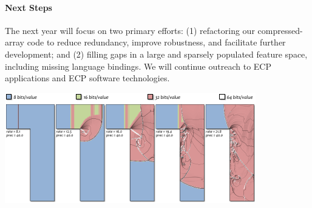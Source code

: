 \noindent
\begin{minipage}[t]{2.625in}
\paragraph{Next Steps}

The next year will focus on two primary efforts: (1) refactoring our compressed-array code to reduce redundancy, improve robustness, and facilitate further development; and (2) filling gaps in a large and sparsely populated feature space, including missing language bindings.  We will continue outreach to ECP applications and ECP software technologies.  
\end{minipage}
\hspace*{0.125in}%
\begin{minipage}[t]{3.75in}
\vspace{0pt}%
\includegraphics[width=\columnwidth]{projects/2.3.4-DataViz/2.3.4.16-ALPINE-ZFP/zfp-adaptive.pdf}%
\vspace{-2ex}%
%
\label{fig:zfp-result}%
\end{minipage}
